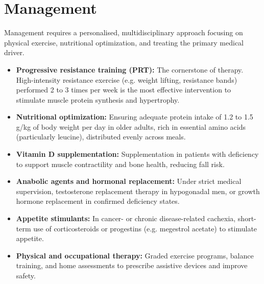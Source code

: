 \section*{Management}
Management requires a personalised, multidisciplinary approach focusing on physical exercise, nutritional optimization, and treating the primary medical driver.
\begin{itemize}
    \item \textbf{Progressive resistance training (PRT):} The cornerstone of therapy. High-intensity resistance exercise (e.g. weight lifting, resistance bands) performed 2 to 3 times per week is the most effective intervention to stimulate muscle protein synthesis and hypertrophy.
    \item \textbf{Nutritional optimization:} Ensuring adequate protein intake of 1.2 to 1.5 g/kg of body weight per day in older adults, rich in essential amino acids (particularly leucine), distributed evenly across meals.
    \item \textbf{Vitamin D supplementation:} Supplementation in patients with deficiency to support muscle contractility and bone health, reducing fall risk.
    \item \textbf{Anabolic agents and hormonal replacement:} Under strict medical supervision, testosterone replacement therapy in hypogonadal men, or growth hormone replacement in confirmed deficiency states.
    \item \textbf{Appetite stimulants:} In cancer- or chronic disease-related cachexia, short-term use of corticosteroids or progestins (e.g. megestrol acetate) to stimulate appetite.
    \item \textbf{Physical and occupational therapy:} Graded exercise programs, balance training, and home assessments to prescribe assistive devices and improve safety.
\end{itemize}

